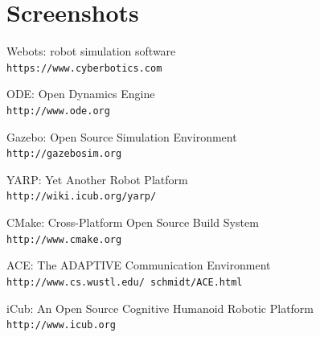 \documentclass[a4paper, 11pt]{report}
\begin{document}
  \appendix
  \chapter{Screenshots}
  
  \begin{thebibliography}{9}
    Webots: robot simulation software
    \\\texttt{https://www.cyberbotics.com}
    
    ODE: Open Dynamics Engine
    \\\texttt{http://www.ode.org}
    
    Gazebo: Open Source Simulation Environment
    \\\texttt{http://gazebosim.org}
    
    YARP: Yet Another Robot Platform 
    \\\texttt{http://wiki.icub.org/yarp/}
    
    CMake: Cross-Platform Open Source Build System 
    \\\texttt{http://www.cmake.org}
    
    ACE: The ADAPTIVE Communication Environment
    \\\texttt{http://www.cs.wustl.edu/~schmidt/ACE.html}
    
    iCub: An Open Source Cognitive Humanoid Robotic Platform
    \\\texttt{http://www.icub.org}
    
  \end{thebibliography}
  
\end{document}
